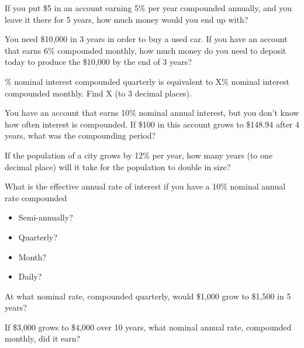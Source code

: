 \documentclass[addpoints, 12pt]{exam}
\begin{document}
\begin{questions}

    \question If you put \$5 in an account earning 5\% per year compounded annually, and you leave it
    there for 5 years, how much money would you end up with?
    \vspace{2in}

    \question You need \$10,000 in 3 years in order to buy a used car. If you have an account
    that earns 6\% compounded monthly, how much money do you need to deposit today to
    produce the \$10,000 by the end of 3 years?
    \vspace{2in}

    \% nominal interest compounded quarterly is equivalent to X\% nominal interest
    compounded monthly. Find X (to 3 decimal places).
    \vspace{2in}

    \question You have an account that earns 10\% nominal annual interest, but you don’t know how
    often interest is compounded. If \$100 in this account grows to \$148.94 after 4 years, what
    was the compounding period?
    \vspace{1.5in}

    \question If the population of a city grows by 12\% per year, how many years (to one decimal place) will it take for
    the population to double in size?
    \vspace{1.5in}

    \question What is the effective annual rate of interest if you have a 10\% nominal annual
    rate compounded
    \begin{itemize}
        \item Semi-annually?
        \item Quarterly?
        \item Month?
        \item Daily?
    \end{itemize}
    \vspace{2in}

    \question At what nominal rate, compounded quarterly, would \$1,000 grow to \$1,500 in 5 years?
    \vspace{2in}

    \question If \$3,000 grows to \$4,000 over 10 years, what nominal annual rate, compounded
    monthly, did it earn?
    \vspace{2in}

\end{questions}
\end{document}
